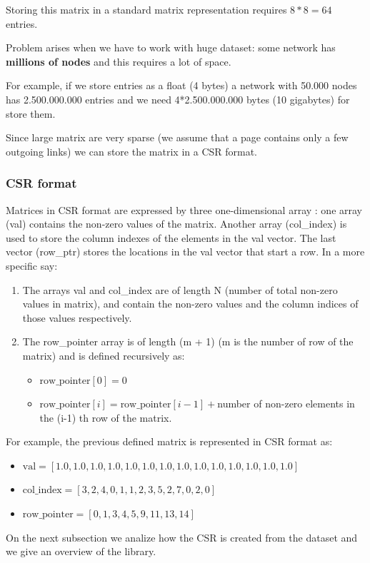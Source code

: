 \documentclass[10pt]{article}
\begin{document}
Storing this matrix in a standard matrix representation requires $8*8 = 64$ entries.

Problem arises when we have to work with huge dataset: some network has {\bf millions of nodes} and this requires a lot of space.

For example, if we store entries as a float (4 bytes) a network with 50.000 nodes has 2.500.000.000 entries and we need 4*2.500.000.000 bytes (10 gigabytes) for store them.

Since large matrix are very sparse (we assume that a page contains only a few outgoing links) we can store the matrix in a CSR format.
\subsubsection{CSR format}
Matrices in CSR format are expressed by three one-dimensional array \cite{DongarraSparseMatrix}: one array (val) contains the non-zero values of the matrix. Another array (col\_index) is used to store the column indexes of the elements in the val vector. The last vector (row\_ptr) stores the locations in the val vector that start a row. In a more specific say:
\begin{enumerate}
    \item The arrays val and col\_index are of length N (number of total non-zero values in matrix), and contain the non-zero values and the column indices of those values respectively.
    \item The row\_pointer array is of length (m + 1) (m is the number of row of the matrix) and is defined recursively as:
    \begin{itemize}
        \item $\text{row\_pointer}[0] = 0$
        \item $\text{row\_pointer}[i] = \text{row\_pointer}[i-1] + $number of non-zero elements in the (i-1) th row of the matrix.
    \end{itemize}
\end{enumerate}
For example, the previous defined matrix is represented in CSR format as:
\begin{itemize}
    \item $\text{val}=[1.0,1.0,1.0,1.0,1.0,1.0,1.0,1.0,1.0,1.0,1.0,1.0,1.0,1.0]$
    \item $\text{col\_index}=[3,2,4,0,1,1,2,3,5,2,7,0,2,0]$
    \item $\text{row\_pointer}=[0,1,3,4,5,9,11,13,14]$
\end{itemize} 
On the next subsection we analize how the CSR is created from the dataset and we give an overview of the library.
\end{document}
